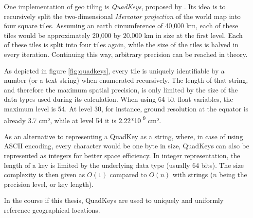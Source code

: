 One implementation of geo tiling is \textit{QuadKeys}, proposed by \cite{Schwartz2018}. Its idea is to recursively split the two-dimensional \textit{Mercator projection} of the world map into four square tiles. Assuming an earth circumference of 40,000 km, each of these tiles would be approximately 20,000 by 20,000 km in size at the first level. Each of these tiles is split into four tiles again, while the size of the tiles is halved in every iteration. Continuing this way, arbitrary precision can be reached in theory.

As depicted in figure \ref{fig:quadkeys}, every tile is uniquely identifiable by a number (or a text string) when enumerated recursively. The length of that string, and therefore the maximum spatial precision, is only limited by the size of the data types used during its calculation. When using 64-bit float variables, the maximum level is 54. At level 30, for instance, ground resolution at the equator is already 3.7 cm², while at level 54 it is 2.22*10\textsuperscript{-9} cm².

As an alternative to representing a QuadKey as a string, where, in case of using ASCII encoding, every character would be one byte in size, QuadKeys can also be represented as integers for better space efficiency. In integer representation, the length of a key is limited by the underlying data type (usually 64 bits). The size complexity is then given as $O(1)$ compared to $O(n)$ with strings ($n$ being the precision level, or key length).

In the course if this thesis, QuadKeys are used to uniquely and uniformly reference geographical locations. 